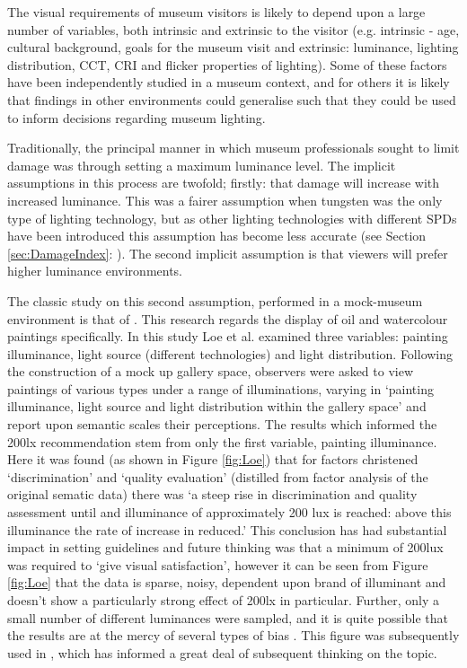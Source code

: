 The visual requirements of museum visitors is likely to depend upon a large number of variables, both intrinsic and extrinsic to the visitor (e.g. intrinsic - age, cultural background, goals for the museum visit and extrinsic: luminance, lighting distribution, \gls{CCT}, \gls{CRI} and flicker properties of lighting). Some of these factors have been independently studied in a museum context, and for others it is likely that findings in other environments could generalise such that they could be used to inform decisions regarding museum lighting.

Traditionally, the principal manner in which museum professionals sought to limit damage was through setting a maximum luminance level. The implicit assumptions in this process are twofold; firstly: that damage will increase with increased luminance. This was a fairer assumption when tungsten was the only type of lighting technology, but as other lighting technologies with different \glspl{SPD} have been introduced this assumption has become less accurate (see Section \ref{sec:DamageIndex}: ). The second implicit assumption is that viewers will prefer higher luminance environments.

The classic study on this second assumption, performed in a mock-museum environment is that of \citet{loe_preferred_1982}. This research regards the display of oil and watercolour paintings specifically. In this study Loe et al. examined three variables: painting illuminance, light source (different technologies) and light distribution. Following the construction of a mock up gallery space, observers were asked to view paintings of various types under a range of illuminations, varying in ‘painting illuminance, light source and light distribution within the gallery space’ and report upon semantic scales their perceptions. The results which informed the 200lx recommendation stem from only the first variable, painting illuminance. Here it was found (as shown in Figure \ref{fig:Loe}) that for factors christened ‘discrimination’ and ‘quality evaluation’ (distilled from factor analysis of the original sematic data) there was ‘a steep rise in discrimination and quality assessment until and illuminance of approximately 200 lux is reached: above this illuminance the rate of increase in reduced.’ This conclusion has had substantial impact in setting guidelines and future thinking was that a minimum of 200lux was required to `give visual satisfaction', however it can be seen from Figure \ref{fig:Loe} that the data is sparse, noisy, dependent upon brand of illuminant and doesn't show a particularly strong effect of 200lx in particular. Further, only a small number of different luminances were sampled, and it is quite possible that the results are at the mercy of several types of bias \citep{fotios_research_2009}. This figure was subsequently used in \citet{thomson_museum_1978}, which has informed a great deal of subsequent thinking on the topic.

